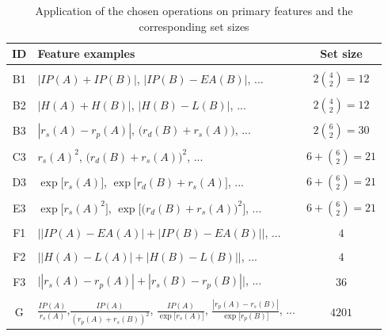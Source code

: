 \documentclass[11pt,oneside,czech,american]{book} %
\theoremstyle{definition} %
\theoremstyle{definition}
\begin{document}
\begin{table}[h]
	\centering
	\begin{tabular}{clc}
		\hline
		ID & Feature examples~ ~                                                                                        & Set size  \\
		\hline
		&&\\ [-1em]
		B1 & $|IP(A)+IP(B)|$, $|IP(B) - EA(B)|$, ...                                                                      & $2\binom{4}{2} = 12$   \\
		
		&&\\ [-1em]
		B2 & $|H(A)+H(B)|$, $|H(B) - L(B)|$, ...                                                                                      & $2\binom{4}{2} = 12$   \\
		
		&&\\ [-1em]
		B3 & $|r_s(A) - r_p(A)|$, $\big(r_d(B) + r_s(A)\big)$, ... & $2\binom{6}{2} = 30$  \\
		
		&&\\ [-1em]
		C3 & $r_s(A)^2$, $\big(r_d(B) + r_s(A)\big)^2$, ...                                                                      & $6+\binom{6}{2}=21$   \\
		
		&&\\ [-1em]
		D3 & $\exp\big[r_s(A)\big]$, $ \exp\big[r_d(B) + r_s(A)\big]$, ...                                                                      & $6+\binom{6}{2}=21$   \\
		
		&&\\ [-1em]
		E3 & $\exp\big[r_s(A)^2\big]$, $\exp\big[\big(r_d(B) + r_s(A)\big)^2 \big]$, ...                                                                      & $6+\binom{6}{2}=21$   \\
		
		&&\\ [-1em]
		F1 & $\big||IP(A)-EA(A)|+|IP(B)-EA(B)|\big|$, ...                                                                      & $4$   \\ 
		
		&&\\ [-1em]
		F2 & $\big||H(A)-L(A)|+|H(B)-L(B)|\big|$, ...                                                                      & $4$   \\ 
		
		&&\\ [-1em]
		F3 & $\big||r_s(A)-r_p(A)|+|r_s(B)-r_p(B)|\big|$, ...                                                                      & $36$   \\
		
		&&\\ [-1em]
		G & $\frac{IP(A)}{r_s(A)}$,$\frac{IP(A)}{(r_p(A)+r_s(B))^2}$, $\frac{IP(A)}{\exp\big[r_s(A)\big]}$, $\frac{|r_p(A)-r_s(B)|}{\exp\big[r_p(B)\big]}$, ...                                                                      & $4201$   \\
		\hline
	\end{tabular}
	\caption{Application of the chosen operations on primary features and the corresponding set sizes}
	\label{descriptors}
\end{table}
\end{document}
